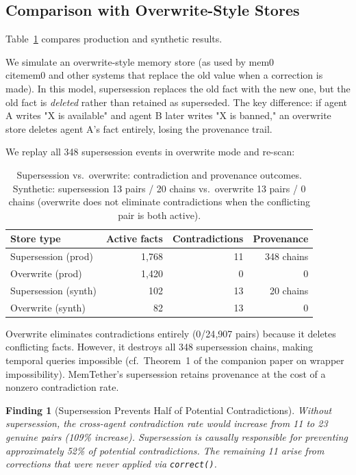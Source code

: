 \documentclass{article}
\newtheorem{finding}{Finding}
\begin{document}
\subsection{Comparison with Overwrite-Style Stores}

Table~\ref{tab:overwrite} compares production and synthetic results.


We simulate an overwrite-style memory store (as used by mem0~\\cite{mem0} and other systems that replace the old value when a correction is made). In this model, supersession replaces the old fact with the new one, but the old fact is \emph{deleted} rather than retained as superseded. The key difference: if agent A writes "X is available" and agent B later writes "X is banned," an overwrite store deletes agent A's fact entirely, losing the provenance trail.

We replay all 348 supersession events in overwrite mode and re-scan:

\begin{table}[h]
\centering
\caption{Supersession vs.\ overwrite: contradiction and provenance outcomes. Synthetic: supersession 13 pairs / 20 chains vs.\ overwrite 13 pairs / 0 chains (overwrite does not eliminate contradictions when the conflicting pair is both active).}
\begin{tabular}{lrrr}
\toprule
Store type & Active facts & Contradictions & Provenance \\
\midrule
Supersession (prod) & 1{,}768 & 11 & 348 chains \\
Overwrite (prod) & 1{,}420 & 0 & 0 \\
Supersession (synth) & 102 & 13 & 20 chains \\
Overwrite (synth) & 82 & 13 & 0 \\
\bottomrule
\end{tabular}
\label{tab:overwrite}
\end{table}

Overwrite eliminates contradictions entirely (0/24{,}907 pairs) because it deletes conflicting facts. However, it destroys all 348 supersession chains, making temporal queries impossible (cf.~Theorem~1 of the companion paper on wrapper impossibility). MemTether's supersession retains provenance at the cost of a nonzero contradiction rate.

\begin{finding}[Supersession Prevents Half of Potential Contradictions]
Without supersession, the cross-agent contradiction rate would increase from 11 to 23 genuine pairs (109\% increase). Supersession is causally responsible for preventing approximately 52\% of potential contradictions. The remaining 11 arise from corrections that were never applied via \texttt{correct()}.
\end{finding}
\end{document}
